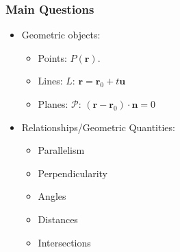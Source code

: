 \begin{frame}
 \frametitle{Main Questions}

\begin{itemize}
  \item Geometric objects:
  \begin{itemize}
    \item Points: $P(\textbf{r})$.
    \item Lines: $L$: $\textbf{r}= \textbf{r}_0 + t\textbf{u}$
    \item Planes: $\mathcal{P}$: $(\textbf{r}-\textbf{r}_0)\cdot \textbf{n} =0$
  \end{itemize}

  \item Relationships/Geometric Quantities:
  \begin{itemize}
      \item Parallelism
      \item Perpendicularity
      \item Angles
      \item Distances
      \item Intersections
  \end{itemize}
\end{itemize}
\end{frame}